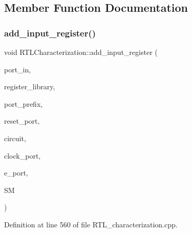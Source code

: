 \subsection{Member Function Documentation}
\mbox{\label{classRTLCharacterization_ad2f002aeb10b1a41ff125d87580bc507}} 
\subsubsection{\texorpdfstring{add\+\_\+input\+\_\+register()}{add\_input\_register()}}
{\footnotesize\ttfamily void R\+T\+L\+Characterization\+::add\+\_\+input\+\_\+register (\begin{DoxyParamCaption}\item[{\hyperlink{structural__objects_8hpp_a8ea5f8cc50ab8f4c31e2751074ff60b2}{structural\+\_\+object\+Ref}}]{port\+\_\+in,  }\item[{const std\+::string \&}]{register\+\_\+library,  }\item[{const std\+::string \&}]{port\+\_\+prefix,  }\item[{\hyperlink{structural__objects_8hpp_a8ea5f8cc50ab8f4c31e2751074ff60b2}{structural\+\_\+object\+Ref}}]{reset\+\_\+port,  }\item[{\hyperlink{structural__objects_8hpp_a8ea5f8cc50ab8f4c31e2751074ff60b2}{structural\+\_\+object\+Ref}}]{circuit,  }\item[{\hyperlink{structural__objects_8hpp_a8ea5f8cc50ab8f4c31e2751074ff60b2}{structural\+\_\+object\+Ref}}]{clock\+\_\+port,  }\item[{\hyperlink{structural__objects_8hpp_a8ea5f8cc50ab8f4c31e2751074ff60b2}{structural\+\_\+object\+Ref}}]{e\+\_\+port,  }\item[{\hyperlink{structural__manager_8hpp_ab3136f0e785d8535f8d252a7b53db5b5}{structural\+\_\+manager\+Ref}}]{SM }\end{DoxyParamCaption})\hspace{0.3cm}{\ttfamily [private]}}



Definition at line 560 of file R\+T\+L\+\_\+characterization.\+cpp.



